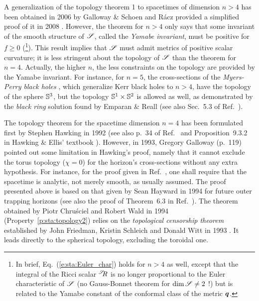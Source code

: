 A generalization of the topology theorem 1 to spacetimes of
dimension $n>4$ has been obtained in 2006 by Galloway \& Schoen \cite{GalloS06}
and R\'acz provided a simplified
proof of it in 2008 \cite{Racz08}.
However, the theorem for $n>4$ only says that some invariant
of the smooth structure of $\mathscr{S}$, called the
\emph{Yamabe invariant}, must be positive for
$f \geq 0$ (\footnote{In brief, Eq.~(\ref{e:sta:Euler_char}) holds for $n>4$
as well, except that the integral of the Ricci scalar ${}^{\mathscr{S}}\!\!R$ is no longer
proportional to the Euler characteristic of $\mathscr{S}$ (no Gauss-Bonnet theorem for $\mathrm{dim}\, \mathscr{S} \neq 2$ !) but is related to the Yamabe constant of the conformal class of the metric $\bm{q}$.}). This result implies that $\mathscr{S}$ must admit metrics of positive scalar curvature; it is
less stringent about the topology of $\mathscr{S}$ than the theorem for $n=4$.
Actually, the higher $n$, the less constraints on
the topology are provided by the Yamabe invariant. For instance,
for $n=5$, the cross-sections of the \emph{Myers-Perry black holes} \cite{MyersP86,EmparR08,Reall14}, which generalize
Kerr black holes to $n>4$, have the
topology of the sphere $\mathbb{S}^3$, but the topology
$\mathbb{S}^1\times\mathbb{S}^2$ is allowed as well, as demonstrated
by the \emph{black ring} solution found by Emparan \& Reall \cite{EmparR02,EmparR08,Reall14} (see also Sec.~5.3 of Ref.~\cite{Chrus20}).


\begin{hist}
The topology theorem for the spacetime dimension $n=4$ has been formulated
first by Stephen Hawking in 1992 \cite{Hawki72}
(see also p.~34 of Ref.~\cite{Hawki73} and Proposition~9.3.2 in Hawking \& Ellis' textbook
\cite{HawkiE73}).
However, in 1993, Gregory Galloway \cite{Gallo94} (p.~119)
pointed out some limitation in Hawking's proof, namely that it cannot
exclude the torus topology ($\chi = 0$) for the horizon's cross-sections
without any extra hypothesis. For instance, for the proof given in Ref.~\cite{Hawki72},
one shall require that the spacetime is analytic, not merely smooth, as
usually assumed.
The proof presented above is based on that given
by Sean Hayward in 1994 \cite{Haywa94}
for future outer trapping horizons (see also the proof of Theorem~6.3 in Ref.~\cite{Newma87}).
The theorem obtained by Piotr Chru\'sciel
and Robert Wald in 1994 \cite{ChrusW94b}
(Property~\ref{p:sta:topology2})
relies on the \emph{topological censorship theorem} established by
John Friedman, Kristin Schleich
and Donald Witt in 1993 \cite{FriedSW93}.
It leads directly to the spherical topology, excluding the toroidal one.
\end{hist}

